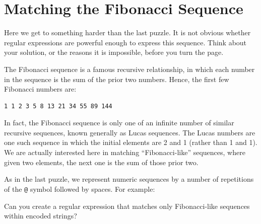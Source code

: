 \newpage

\hypertarget{matching-the-fibonacci-sequence}{%
\section{Matching the Fibonacci
Sequence}\label{matching-the-fibonacci-sequence}}

Here we get to something harder than the last puzzle. It is not obvious
whether regular expressions are powerful enough to express this
sequence. Think about your solution, or the reasons it is impossible,
before you turn the page.

The Fibonacci sequence is a famous recursive relationship, in which each
number in the sequence is the sum of the prior two numbers. Hence, the
first few Fibonacci numbers are:

\begin{verbatim}
1 1 2 3 5 8 13 21 34 55 89 144
\end{verbatim}

In fact, the Fibonacci sequence is only one of an infinite number of
similar recursive sequences, known generally as Lucas sequences. The
Lucas numbers are one such sequence in which the initial elements are 2
and 1 (rather than 1 and 1). We are actually interested here in matching
``Fibonacci-like'' sequences, where given two elements, the next one is
the sum of those prior two.

As in the last puzzle, we represent numeric sequences by a number of
repetitions of the \texttt{@} symbol followed by spaces. For example:

\begin{Shaded}
\begin{Highlighting}[]
\OperatorTok{=} 
\OperatorTok{=} 
\OperatorTok{=} 
\OperatorTok{=} 
\OperatorTok{=} 
\end{Highlighting}
\end{Shaded}

Can you create a regular expression that matches only Fibonacci-like
sequences within encoded strings?

